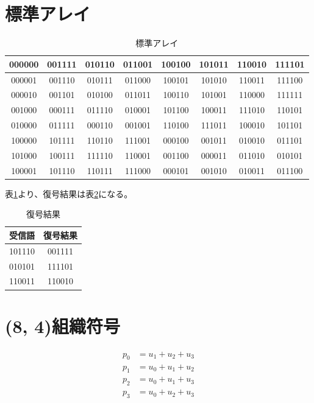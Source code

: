 \documentclass[a4paper,11pt]{jsarticle}
\begin{document}
\section{標準アレイ}
\begin{table}[hbtp]
  \caption{標準アレイ}
  \label{table:std-array}
  \centering
  \begin{tabular}{c|ccccccc}
    000000 & 001111 &	010110 & 011001	& 100100 & 101011 &	110010 & 111101 \\
    \hline
    000001 & 001110 &	010111 & 011000 &	100101 & 101010	& 110011 & 111100 \\
    000010 & 001101	& 010100 & 011011	& 100110 & 101001 & 110000 & 111111 \\
    001000 & 000111	& 011110 & 010001	& 101100 & 100011	& 111010 & 110101 \\
    010000 & 011111	& 000110 & 001001	& 110100 & 111011 & 100010 & 101101 \\
    100000 & 101111	& 110110 & 111001	& 000100 & 001011	& 010010 & 011101 \\
    101000 & 100111 & 111110 & 110001 & 001100 & 000011 & 011010 & 010101 \\
    100001 & 101110	& 110111 & 111000	& 000101 & 001010	& 010011 & 011100
  \end{tabular}
\end{table}

表\ref{table:std-array}より、復号結果は表\ref{table:decoded}になる。

\begin{table}[hbtp]
  \caption{復号結果}
  \label{table:decoded}
  \centering
  \begin{tabular}{|cc|}
    \hline
    受信語 & 復号結果 \\ \hline \hline
    101110 & 001111 \\ \hline
    010101 & 111101 \\ \hline
    110011 & 110010 \\ \hline
  \end{tabular}
\end{table}

\section{(8, 4)組織符号}
\begin{eqnarray*}
  p_0 &= u_1 + u_2 + u_3 \\
  p_1 &= u_0 + u_1 + u_2 \\
  p_2 &= u_0 + u_1 + u_3 \\
  p_3 &= u_0 + u_2 + u_3
\end{eqnarray*}
\end{document}
